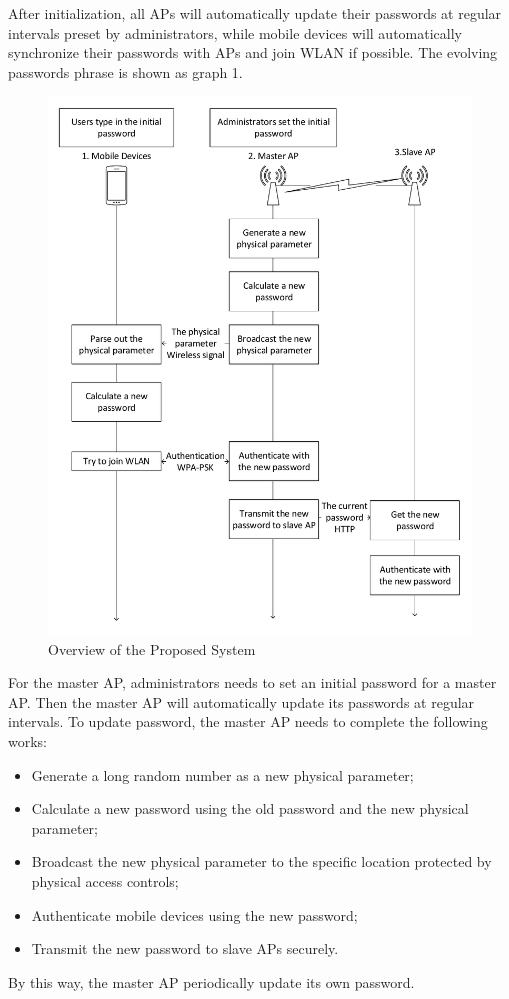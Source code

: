 After initialization, all APs will automatically update their passwords at regular intervals preset by administrators, while mobile devices will automatically synchronize their passwords with APs and join WLAN if possible. The evolving passwords phrase is shown as graph 1. 
\begin{figure}
	\begin{center}
		\includegraphics[width=\textwidth]{Large_Organization_Scenario.pdf}
		\caption{Overview of the Proposed System}
		\label{Fig:4.1}
	\end{center}
\end{figure}

For the master AP, administrators needs to set an initial password for a master AP. Then the master AP will automatically update its passwords at regular intervals. To update password, the master AP needs to complete the following works: 
\begin{itemize}
	\item Generate a long random number as a new physical parameter; 
	\item Calculate a new password using the old password and the new physical parameter; 
	\item Broadcast the new physical parameter to the specific location protected by physical access controls; 
	\item Authenticate mobile devices using the new password; 
	\item Transmit the new password to slave APs securely. 
\end{itemize}
By this way, the master AP periodically update its own password. 

